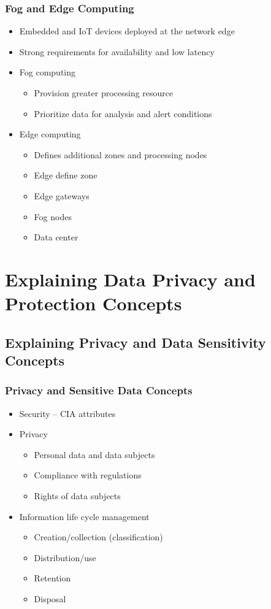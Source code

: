 		\subsubsection {Fog and Edge Computing}
			\begin{itemize}
				\item Embedded and IoT devices deployed at the network edge
				\item Strong requirements for availability and low latency
				\item Fog computing
					\begin{itemize}
						\item Provision greater processing resource
						\item Prioritize data for analysis and alert conditions
					\end{itemize}
				\item Edge computing
					\begin{itemize}
						\item Defines additional zones and processing nodes
						\item Edge define zone
						\item Edge gateways
						\item Fog nodes
						\item Data center
					\end{itemize}
			\end{itemize}

\section {Explaining Data Privacy and Protection Concepts}
	\subsection {Explaining Privacy and Data Sensitivity Concepts}
		\subsubsection {Privacy and Sensitive Data Concepts}
			\begin{itemize}
				\item Security -- CIA attributes
				\item Privacy
					\begin{itemize}
						\item Personal data and data subjects
						\item Compliance with regulations
						\item Rights of data subjects
					\end{itemize}
				\item Information life cycle management
					\begin{itemize}
						\item Creation/collection (classification)
						\item Distribution/use
						\item Retention
						\item Disposal
					\end{itemize}
			\end{itemize}
